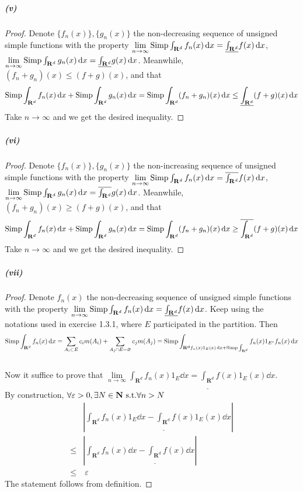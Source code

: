 \documentclass{article}
\begin{document}
\subparagraph{(v)}
\begin{proof}
Denote $\{f_n(x)\},\{g_n(x)\}$ the non-decreasing sequence of unsigned simple functions with the property $\lim\limits_{n\to\infty}\mathrm{Simp}\int_{\mathbf{R}^d}f_n(x)\,\mathrm{d} x=\underline{\int_{\mathbf{R}^d}}f(x)\,\mathrm{d} x$, $\lim\limits_{n\to\infty}\mathrm{Simp}\int_{\mathbf{R}^d}g_n(x)\,\mathrm{d} x=\underline{\int_{\mathbf{R}^d}}g(x)\,\mathrm{d} x$. Meanwhile, $(f_n+g_n)(x)\leq(f+g)(x)$, and that
\[\mathrm{Simp}\int_{\mathbf{R}^d}f_n(x)\,\mathrm{d} x+\mathrm{Simp}\int_{\mathbf{R}^d}g_n(x)\,\mathrm{d} x=\mathrm{Simp}\int_{\mathbf{R}^d}(f_n+g_n)(x)\,\mathrm{d} x\leq \underline{\int_{\mathbf{R}^d}}(f+g)(x)\,\mathrm{d} x\]
Take $n\to \infty$ and we get the desired inequality.
\end{proof}
\subparagraph{(vi)}
\begin{proof}
Denote $\{f_n(x)\},\{g_n(x)\}$ the non-increasing sequence of unsigned simple functions with the property $\lim\limits_{n\to\infty}\mathrm{Simp}\int_{\mathbf{R}^d}f_n(x)\,\mathrm{d} x=\overline{\int_{\mathbf{R}^d}}f(x)\,\mathrm{d} x$, $\lim\limits_{n\to\infty}\mathrm{Simp}\int_{\mathbf{R}^d}g_n(x)\,\mathrm{d} x=\overline{\int_{\mathbf{R}^d}}g(x)\,\mathrm{d} x$. Meanwhile, $(f_n+g_n)(x)\geq(f+g)(x)$, and that
\[\mathrm{Simp}\int_{\mathbf{R}^d}f_n(x)\,\mathrm{d} x+\mathrm{Simp}\int_{\mathbf{R}^d}g_n(x)\,\mathrm{d} x=\mathrm{Simp}\int_{\mathbf{R}^d}(f_n+g_n)(x)\,\mathrm{d} x\geq \overline{\int_{\mathbf{R}^d}}(f+g)(x)\,\mathrm{d} x\]
Take $n\to \infty$ and we get the desired inequality.
\end{proof}
\subparagraph{(vii)}
\begin{proof}
Denote $f_n(x)$ the non-decreasing sequence of unsigned simple functions with the property $\lim\limits_{n\to\infty}\mathrm{Simp}\int_{\mathbf{R}^d}f_n(x)\,\mathrm{d} x=\underline{\int_{\mathbf{R}^d}}f(x)\,\mathrm{d} x$. Keep using the notations used in exercise 1.3.1, where $E$ participated in the partition. Then 
\[\mathrm{Simp}\int_{\mathbf{R}^d}f_n(x)\,\mathrm{d} x=\sum_{A_i\subset E}c_im(A_i)+\sum_{A_j\cap E=\varnothing}c_jm(A_j)=\mathrm{Simp}\int_{\mathbf{R^d}f_n(x)1_{E}(x)\,\mathrm{d} x+\mathrm{Simp}\int_{\mathbf{R}^d}}f_n(x)1_{E^c}f_n(x)\,\mathrm{d} x\]\\
Now it suffice to prove that $\lim\limits_{n\to\infty}\int_{\mathbf{R}^d}f_n(x)1_{E}\dd x=\underline{\int_{\mathbf{R}^d}}f(x)1_E(x)\dd x$.\\
By construction, $\forall \varepsilon>0,\exists N\in\mathbf{N}\text{ s.t.} \forall n>N$
\[\begin{aligned}
&|\int_{\mathbf{R}^d}f_n(x)1_{E}\dd x-\underline{\int_{\mathbf{R}^d}}f(x)1_E(x)\dd x|\\
\leq&|\int_{\mathbf{R}^d}f_n(x)\dd x-\underline{\int_{\mathbf{R}^d}}f(x)\dd x|\\
\leq&\ \varepsilon
\end{aligned}\]
The statement follows from definition.
\end{proof}
\end{document}
